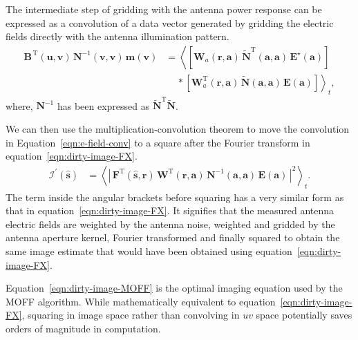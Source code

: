 \documentclass[a4paper,fleqn,usenatbib]{mnras}
\begin{document}
The intermediate step of gridding with the antenna power response can be expressed as a convolution of a data vector generated by gridding the electric fields directly with the antenna illumination pattern.
\begin{align}
\mathbf{B}^{\,\textrm{T}}(\mathbf{u},\mathbf{v})\,\mathbf{N}^{-1}(\mathbf{v} ,\mathbf{v})\,\mathbf{m}(\mathbf{v}) &= \left\langle \left[\mathbf{W}_a(\mathbf{r},\mathbf{a})\,\widetilde{\mathbf{N}}^\textrm{T}\!(\mathbf{a},\mathbf{a})\, \mathbf{E}^\star(\mathbf{a})\right]\right. \nonumber\\ 
&\,\quad\ast\left.\left[\mathbf{W}^\textrm{T}_a(\mathbf{r},\mathbf{a})\,\widetilde{\mathbf{N}}\!(\mathbf{a},\mathbf{a})\,\mathbf{E}(\mathbf{a})\right]\right\rangle_t, \label{eqn:e-field-conv}
\end{align}
where, $\mathbf{N}^{-1}$ has been expressed as $\widetilde{\mathbf{N}}^\textrm{T}\widetilde{\mathbf{N}}$.

We can then use the multiplication-convolution theorem to move the convolution in Equation~\ref{eqn:e-field-conv} to a square after the Fourier transform in equation~\ref{eqn:dirty-image-FX}.
\begin{align}
  \boldsymbol{\mathcal{I}}^\prime(\hat{\mathbf{s}}) &= \left\langle \left|\,\mathbf{F}^\textrm{T}(\hat{\mathbf{s}},\mathbf{r})\,\mathbf{W}^\textrm{T}(\mathbf{r},\mathbf{a})\,\mathbf{N}^{-1}(\mathbf{a},\mathbf{a})\,\mathbf{E}(\mathbf{a})\,\right|^2\right\rangle_t. \label{eqn:dirty-image-MOFF}
\end{align}
The term inside the angular brackets before squaring has a very similar form as that in equation~\ref{eqn:dirty-image-FX}. It signifies that the measured antenna electric fields are weighted by the antenna noise, weighted and gridded by the antenna aperture kernel, Fourier transformed and finally squared to obtain the same image estimate that would have been obtained using equation~\ref{eqn:dirty-image-FX}. 

Equation~\ref{eqn:dirty-image-MOFF} is the optimal imaging equation used by the MOFF algorithm. While mathematically equivalent to equation~\ref{eqn:dirty-image-FX}, squaring in image space rather than convolving in $uv$ space potentially saves orders of magnitude in computation.
\end{document}
